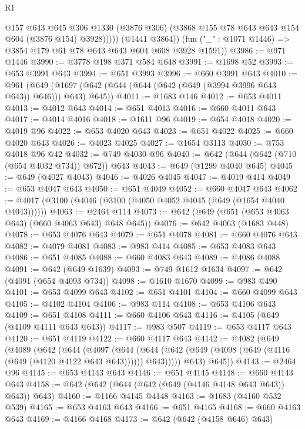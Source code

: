 \begin{lexlean}{R1}
\begin{coremodule}
                @157
                @643
                @645
                @306
                @1330
                (@3876 @306)
                (@3868 @155 @78 @643 @643 @154 @604 (@3876 @154) @3928)))))
        (@1441 @3864))
      (fun ("_" : @1071 @1446) => @3854 @179 @61 @78 @643 @643 @604 @608 @3928 @1591))
@3986 := @971 @1446
@3990 := @3778 @198 @371 @584 @648
@3991 := @1698 @52
@3993 := @653 @3991 @643
@3994 := @651 @3993
@3996 := @660 @3991 @643
@4010 := @961
    (@649 (@1697 (@642 (@644 (@644 (@642 (@649 (@3994 @3996 @643 @643)) @646))) @643) @645))
@4011 := @1683 @146
@4012 := @653 @4011
@4013 := @4012 @643
@4014 := @651 @4013
@4016 := @660 @4011 @643
@4017 := @4014 @4016
@4018 := @1611 @96
@4019 := @654 @4018
@4020 := @4019 @96
@4022 := @653 @4020 @643
@4023 := @651 @4022
@4025 := @660 @4020 @643
@4026 := @4023 @4025
@4027 := @1654 @3113
@4030 := @753 @4018 @96 @42
@4032 := @749 @4030 @96
@4040 := @642 (@644 (@642 (@710 (@654 @4032 @734)) @672)) @643
@4043 := @649 (@1299 @4040 @645)
@4045 := @649 (@4027 @4043)
@4046 := @4026 @4045
@4047 := @4019 @414
@4049 := @653 @4047 @643
@4050 := @651 @4049
@4052 := @660 @4047 @643
@4062 := @4017 (@3100 (@4046 (@3100 (@4050 @4052 @4045 (@649 (@1654 @4040 @4043))))))
@4063 := @2464 @114
@4073 := @642 (@649 (@651 (@653 @4063 @643) (@660 @4063 @643) @648 @645))
@4076 := @642 @4063 (@1683 @448)
@4078 := @653 @4076 @643
@4079 := @651 @4078
@4081 := @660 @4076 @643
@4082 := @4079 @4081
@4083 := @983 @414
@4085 := @653 @4083 @643
@4086 := @651 @4085
@4088 := @660 @4083 @643
@4089 := @4086 @4088
@4091 := @642 (@649 @1639)
@4093 := @749 @1612 @1634
@4097 := @642 (@4091 (@654 @4093 @734))
@4098 := @1610 @1670
@4099 := @983 @490
@4101 := @653 @4099 @643
@4102 := @651 @4101
@4104 := @660 @4099 @643
@4105 := @4102 @4104
@4106 := @983 @114
@4108 := @653 @4106 @643
@4109 := @651 @4108
@4111 := @660 @4106 @643
@4116 := @4105 (@649 (@4109 @4111 @643 @643))
@4117 := @983 @507
@4119 := @653 @4117 @643
@4120 := @651 @4119
@4122 := @660 @4117 @643
@4142 := @4082
    (@649
      (@4089
        (@642
          (@644
            (@4097
              (@644
                (@644 (@642 (@649 (@4098 (@649 (@4116 (@649 (@4120 @4122 @643 @643)))))) @643)))))
          @643)
        @645))
@4143 := @2464 @96
@4145 := @653 @4143 @643
@4146 := @651 @4145
@4148 := @660 @4143 @643
@4158 := @642 (@642 (@644 (@642 (@649 (@4146 @4148 @643 @643)) @643)) @643)
@4160 := @1166 @4145 @4148
@4163 := @1683 (@4160 @532 @539)
@4165 := @653 @4163 @643
@4166 := @651 @4165
@4168 := @660 @4163 @643
@4169 := @4166 @4168
@4173 := @642 (@642 (@4158 @646) @643)

\end{coremodule}
\end{lexlean}
